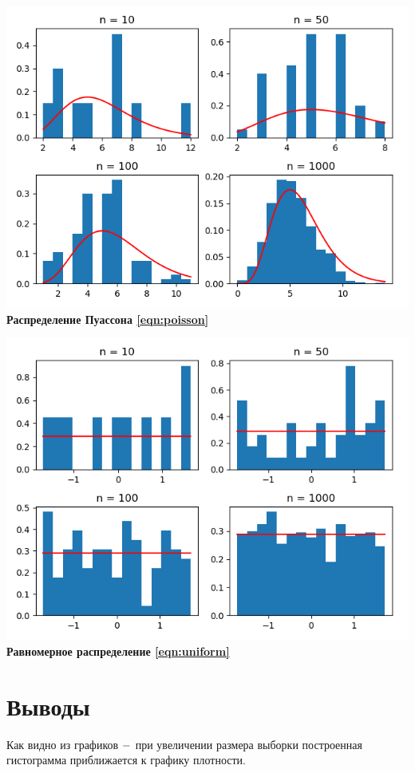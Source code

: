 \documentclass[a4]{article}
\begin{document}
\begin{center}
\includegraphics[width=\textwidth]{distribution_poisson.png} \textbf{Распределение Пуассона \eqref{eqn:poisson}}

\includegraphics[width=\textwidth]{distribution_uniform.png} \textbf{Равномерное распределение \eqref{eqn:uniform}}

\end{center}


\section{Выводы}
\par Как видно из графиков $\--$ при увеличении размера выборки построенная гистограмма приближается к графику плотности.
\end{document}
